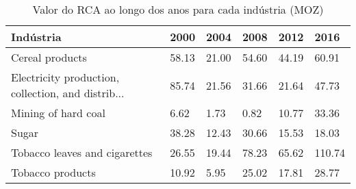 \begin{table}
\centering
\caption{Valor do RCA ao longo dos anos para cada indústria (MOZ)}
\label{tab:ex3-tempo-MOZ}
\begin{tabular}{p{6cm}p{1.5cm}p{1.5cm}p{1.5cm}p{1.5cm}p{1.5cm}}
\toprule
                                         Indústria &  2000 &  2004 &  2008 &  2012 &   2016 \\
\midrule
                                   Cereal products & 58.13 & 21.00 & 54.60 & 44.19 &  60.91 \\
Electricity production, collection, and distrib... & 85.74 & 21.56 & 31.66 & 21.64 &  47.73 \\
                               Mining of hard coal &  6.62 &  1.73 &  0.82 & 10.77 &  33.36 \\
                                             Sugar & 38.28 & 12.43 & 30.66 & 15.53 &  18.03 \\
                     Tobacco leaves and cigarettes & 26.55 & 19.44 & 78.23 & 65.62 & 110.74 \\
                                  Tobacco products & 10.92 &  5.95 & 25.02 & 17.81 &  28.77 \\
\bottomrule
\end{tabular}
\end{table}
